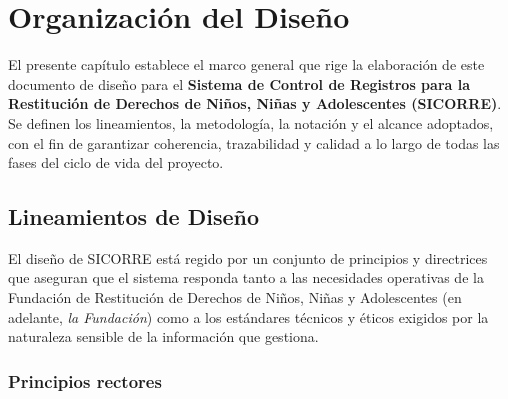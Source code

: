 
\chapter{Organización del Diseño}

El presente capítulo establece el marco general que rige la elaboración de este documento
de diseño para el \textbf{Sistema de Control de Registros para la Restitución de Derechos
	de Niños, Niñas y Adolescentes (SICORRE)}. Se definen los lineamientos, la metodología,
la notación y el alcance adoptados, con el fin de garantizar coherencia, trazabilidad y
calidad a lo largo de todas las fases del ciclo de vida del proyecto.

\section{Lineamientos de Diseño}

El diseño de SICORRE está regido por un conjunto de principios y directrices que aseguran
que el sistema responda tanto a las necesidades operativas de la Fundación de Restitución
de Derechos de Niños, Niñas y Adolescentes (en adelante, \textit{la Fundación}) como a
los estándares técnicos y éticos exigidos por la naturaleza sensible de la información
que gestiona.

\subsection*{Principios rectores}

